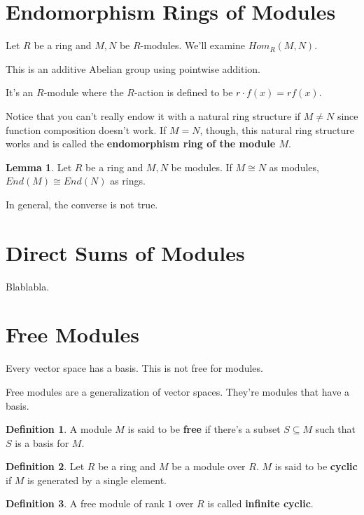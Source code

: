 \documentclass{article}
\theoremstyle{definition}
\newtheorem{definition}{Definition}
\newtheorem{lemma}[theorem]{Lemma}
\begin{document}
\section{Endomorphism Rings of Modules}

Let $R$ be a ring and $M,N$ be $R$-modules. We'll examine $Hom_{R}(M,N)$.

This is an additive Abelian group using pointwise addition.

It's an $R$-module where the $R$-action is defined to be $r \cdot f(x) = rf(x)$.

Notice that you can't really endow it with a natural ring structure if $M \neq N$ since
function composition doesn't work. If $M = N$, though, this natural ring structure
works and is called the \textbf{endomorphism ring of the module $M$}.

\begin{lemma}
    Let $R$ be a ring and $M,N$ be modules. If $M \cong N$ as modules, 
    $End(M) \cong End(N)$ as rings.
\end{lemma}

In general, the converse is not true.

\newpage

\section{Direct Sums of Modules}

Blablabla.

\newpage

\section{Free Modules}

Every vector space has a basis. This is not free for modules.

Free modules are a generalization of vector spaces. They're modules that have a basis.

\begin{definition}
    A module $M$ is said to be \textbf{free} if there's a subset $S \subseteq M$ such that $S$ is a basis for $M$.
\end{definition}

\begin{definition}
    Let $R$ be a ring and $M$ be a module over $R$. $M$ is said to be \textbf{cyclic} if $M$ is generated by a single element.
\end{definition}

\begin{definition}
    A free module of rank $1$ over $R$ is called \textbf{infinite cyclic}.
\end{definition}
\end{document}
